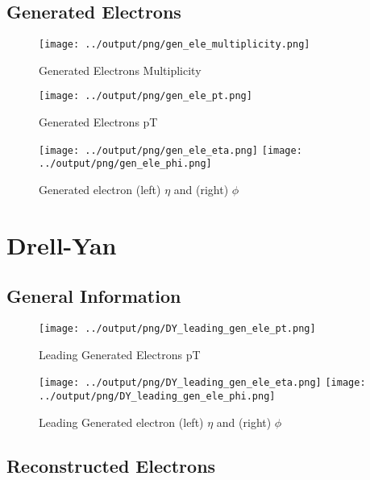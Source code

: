 \documentclass[11pt]{book}
\begin{document}
\section{Generated Electrons}

\begin{figure}[ht]
\centering
\texttt{[image: ../output/png/gen\_ele\_multiplicity.png]}
\caption{Generated Electrons Multiplicity}
\label{fig:gen_ele_multiplicity}
\end{figure}


\begin{figure}[ht]
\centering
\texttt{[image: ../output/png/gen\_ele\_pt.png]}
\caption{Generated Electrons pT}
\label{fig:gen_ele_pt}
\end{figure}
\clearpage

\begin{figure}[ht]
\centering
\texttt{[image: ../output/png/gen\_ele\_eta.png]}
\texttt{[image: ../output/png/gen\_ele\_phi.png]}
\caption{Generated electron (left) $\eta$ and (right) $\phi$}
\label{fig:gen_ele_eta_phi}
\end{figure}

\chapter{Drell-Yan}
\section{General Information}

\begin{figure}[ht]
\centering
\texttt{[image: ../output/png/DY\_leading\_gen\_ele\_pt.png]}
\caption{Leading Generated Electrons pT}
\label{fig:dy_leading_gen_ele_pt}
\end{figure}

\begin{figure}[ht]
\centering
\texttt{[image: ../output/png/DY\_leading\_gen\_ele\_eta.png]}
\texttt{[image: ../output/png/DY\_leading\_gen\_ele\_phi.png]}
\caption{Leading Generated electron (left) $\eta$ and (right) $\phi$}
\label{fig:dy_leading_gen_ele_eta_phi}
\end{figure}
\clearpage

\section{Reconstructed Electrons}
\end{document}

